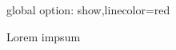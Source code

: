 \documentclass{article}
\begin{document}
\tTitle{}
{global option: show,linecolor=red}


Lorem
impsum
\end{document}
